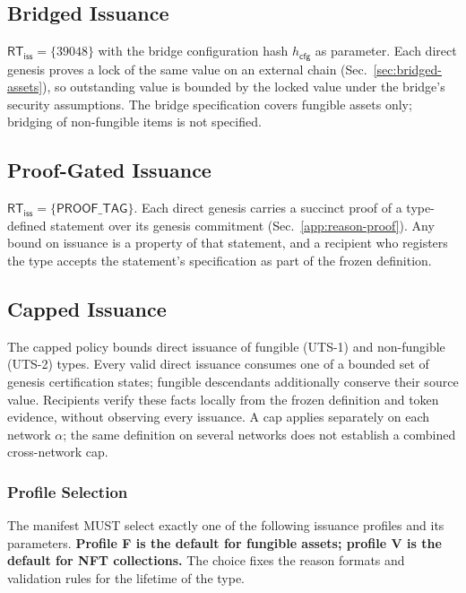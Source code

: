\subsection{Bridged Issuance}\label{app:policy-bridged}

$\mathsf{RT}_\mathsf{iss} = \{39048\}$ with the bridge configuration hash $h_\mathsf{cfg}$ as parameter. Each direct genesis proves a lock of the same value on an external chain (Sec.~\ref{sec:bridged-assets}), so outstanding value is bounded by the locked value under the bridge's security assumptions. The bridge specification covers fungible assets only; bridging of non-fungible items is not specified.

\subsection{Proof-Gated Issuance}\label{app:policy-proof}

$\mathsf{RT}_\mathsf{iss} = \{\mathsf{PROOF\_TAG}\}$. Each direct genesis carries a succinct proof of a type-defined statement over its genesis commitment (Sec.~\ref{app:reason-proof}). Any bound on issuance is a property of that statement, and a recipient who registers the type accepts the statement's specification as part of the frozen definition.

\subsection{Capped Issuance}\label{app:uts-capped}

The capped policy bounds direct issuance of fungible (UTS-1) and non-fungible (UTS-2) types. Every valid direct issuance consumes one of a bounded set of genesis certification states; fungible descendants additionally conserve their source value. Recipients verify these facts locally from the frozen definition and token evidence, without observing every issuance. A cap applies separately on each network $\alpha$; the same definition on several networks does not establish a combined cross-network cap.

\subsubsection{Profile Selection}\label{app:capped-selection}

The manifest MUST select exactly one of the following issuance profiles and its parameters. \textbf{Profile F is the default for fungible assets; profile V is the default for NFT collections.} The choice fixes the reason formats and validation rules for the lifetime of the type.

